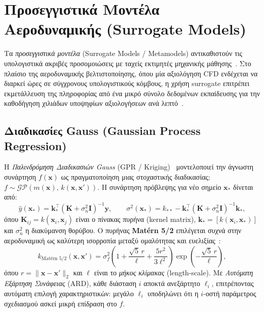 \section{Προσεγγιστικά Μοντέλα Αεροδυναμικής (Surrogate Models)}
\label{sec:bg_surrogates}

Τα \textit{προσεγγιστικά μοντέλα} (Surrogate Models / Metamodels) αντικαθιστούν τις υπολογιστικά ακριβές προσομοιώσεις με ταχείς εκτιμητές μηχανικής μάθησης~\cite{jin2011surrogate}. Στο πλαίσιο της αεροδυναμικής βελτιστοποίησης, όπου μία αξιολόγηση CFD ενδέχεται να διαρκεί ώρες σε σύγχρονους υπολογιστικούς κόμβους, η χρήση surrogate επιτρέπει εκμετάλλευση της πληροφορίας από ένα μικρό σύνολο δεδομένων εκπαίδευσης για την καθοδήγηση χιλιάδων υποψηφίων αξιολογήσεων ανά λεπτό~\cite{forrester2008engineering}.

\subsection*{Διαδικασίες Gauss (Gaussian Process Regression)}

Η \textit{Παλινδρόμηση Διαδικασιών Gauss} (GPR / Kriging)~\cite{rasmussen2006gaussian} μοντελοποιεί την άγνωστη συνάρτηση $f(\bm{x})$ ως πραγματοποίηση μιας στοχαστικής διαδικασίας: $f \sim \mathcal{GP}(m(\bm{x}),\, k(\bm{x}, \bm{x}'))$. Η συνάρτηση πρόβλεψης για νέο σημείο $\bm{x}_*$ δίνεται από:
\begin{equation}
    \hat{y}(\bm{x}_*) = \bm{k}_*^\top (\bm{K} + \sigma_n^2 \bm{I})^{-1} \bm{y},
    \qquad
    \sigma^2(\bm{x}_*) = k_{**} - \bm{k}_*^\top (\bm{K} + \sigma_n^2 \bm{I})^{-1} \bm{k}_*,
\end{equation}
όπου $\bm{K}_{ij} = k(\bm{x}_i, \bm{x}_j)$ είναι ο πίνακας πυρήνα (kernel matrix), $\bm{k}_* = [k(\bm{x}_i, \bm{x}_*)]$ και $\sigma_n^2$ η διακύμανση θορύβου. Ο πυρήνας \textbf{Matérn 5/2} επιλέγεται συχνά στην αεροδυναμική ως καλύτερη ισορροπία μεταξύ ομαλότητας και ευελιξίας~\cite{gramacy2020surrogates}:
\begin{equation}
    k_{\text{Mat\'{e}rn 5/2}}(\bm{x}, \bm{x}') = \sigma_f^2\!\left(1 + \frac{\sqrt{5}\,r}{\ell} + \frac{5 r^2}{3\ell^2}\right)\exp\!\left(-\frac{\sqrt{5}\,r}{\ell}\right),
\end{equation}
όπου $r = \|\bm{x} - \bm{x}'\|_2$ και $\ell$ είναι το \textit{μήκος κλίμακας} (length-scale). Με \textit{Αυτόματη Εξάρτηση Συνάφειας} (ARD), κάθε διάσταση $i$ αποκτά ανεξάρτητο $\ell_i$, επιτρέποντας αυτόματη επιλογή χαρακτηριστικών: μεγάλο $\ell_i$ υποδηλώνει ότι η $i$-οστή παράμετρος σχεδιασμού ασκεί μικρή επίδραση στο $f$.

